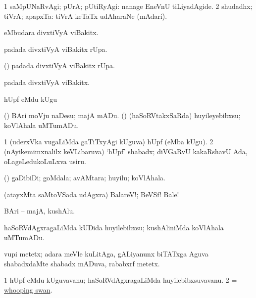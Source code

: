 \bentry
{}
\gl{\kirxvi}
\bmng
\bnum
\num{1} saMpUNaRvAgi; pUrA; pUtiRyAgi:  nanage EneVnU tiLiyadAgide. 
\num{2} shudadhx; tiVrA; apapxTa:  tiVrA keTaTx udAharaNe (mAdari). 
\enum
\emng
\eentry

\bentry
{}
\gl{\sanA}
\bmng
{} eMbudara divxtiVyA viBakitx. 
\emng
\eentry

\bentry
{}
\gl{\sanA}
\bmng
{} padada divxtiVyA viBakitx rUpa. 
\emng
\eentry

\bentry
{}
\gl{\sanA}
\bmng
(\pArxparx)  padada divxtiVyA viBakitx rUpa. 
\emng
\eentry

\bentry
{}
\gl{\sanA}
\bmng
{} padada divxtiVyA viBakitx. 
\emng
\eentry

\bentry
{} 
\gl{\akirx}
\expl{}
\bmng
hUpf eMdu kUgu 
\emng

\noindent
\gl{\pagu} 
\bmng
  (\AmA) 
\banum
{} BAri moVju naDesu; majA mADu. 
 (\ame) (haSoRVtakxSaRda) huyileyebibxsu; koVlAhala uMTumADu. 
\eanum
\emng
\eentry

\bentry
{} 
\gl{\nA}
\bmng
\bnum
\num{1} (uderxVka \mo vugaLiMda gaTiTxyAgi kUguva) hUpf (eMba kUgu). 
\num{2} (nAyikemimxnalilx keVLibaruva) `hUpf' shabadx; diVGaRvU kakaRshavU Ada, oLageLedukoLuLxva usiru. 
\enum
\emng
\eentry

\bentry
{}
\gl{\nA}
\bmng
(\ame) gaDibiDi; goMdala; avAMtara; huyilu; koVlAhala. 
\emng
\eentry

\bentry
{}
\gl{\BAavayx}
\bmng
(atayxMta saMtoVSada udAgxra) BalareV!; BeVSf! Bale! 
\emng
\eentry

\bentry
{}
\gl{\nA}
\bmng
BAri -- majA, kushAlu. 
\emng

\noindent
\gl{\pagu}
\bmng
{} haSoRVdAgxragaLiMda kUDida huyilebibxsu; kushAliniMda koVlAhala uMTumADu. 
\emng
\eentry

\bentry
{}
\gl{\nA}
\bmng
vupi metetx; adara meVle kuLitAga, gALiyanunx biTATxga Aguva shabadxdaMte shabadx mADuva, rababxrf metetx. 
\emng
\eentry

\bentry
{}
\gl{\nA}
\bmng
\bnum
\num{1} hUpf eMdu kUguvavanu; haSoRVdAgxragaLiMda huyilebibxsuvavanu. 
\num{2} = \hyperlink{whooping swan}{whooping swan}. 
\enum
\emng
\eentry

